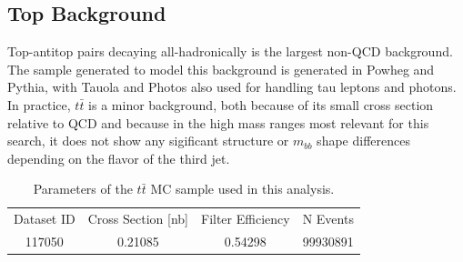


\subsection{Top Background}
Top-antitop pairs decaying all-hadronically is the largest non-QCD background.  The sample generated
to model this background is generated in Powheg and Pythia, with Tauola and Photos also used for
handling tau leptons and photons.  In practice, $t\bar{t}$ is a minor background, both because
of its small cross section relative to QCD and because in the high mass ranges most relevant for
this search, it does not show any sigificant structure or $m_{bb}$ shape differences depending
on the flavor of the third jet.


\begin{table}
   \caption{Parameters of the $t\bar{t}$ MC sample used in this analysis. \label{tab:ttbar_params} }
    \begin{tabular}{ c c c c }
    Dataset ID & Cross Section [nb] & Filter Efficiency & N Events \\
    117050     & 0.21085        & 0.54298    & 99930891 \\
    \end{tabular}
\end{table}







